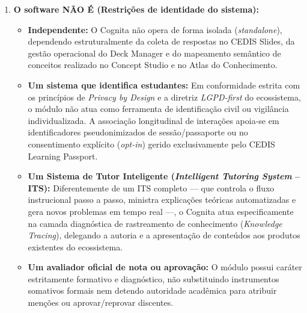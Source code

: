 \begin{enumerate}
    \item \textbf{O software NÃO É (Restrições de identidade do sistema):}
    \begin{itemize}
        \item \textbf{Independente:} O Cognita não opera de forma isolada (\textit{standalone}), dependendo estruturalmente da coleta de respostas no CEDIS Slides, da gestão operacional do Deck Manager e do mapeamento semântico de conceitos realizado no Concept Studio e no Atlas do Conhecimento.
        \item \textbf{Um sistema que identifica estudantes:} Em conformidade estrita com os princípios de \textit{Privacy by Design} \cite{cavoukian_privacy_2009} e a diretriz \textit{LGPD-first} do ecossistema, o módulo não atua como ferramenta de identificação civil ou vigilância individualizada. A associação longitudinal de interações apoia-se em identificadores pseudonimizados de sessão/passaporte ou no consentimento explícito (\textit{opt-in}) gerido exclusivamente pelo CEDIS Learning Passport.
        \item \textbf{Um Sistema de Tutor Inteligente (\textit{Intelligent Tutoring System} -- ITS):} Diferentemente de um ITS completo — que controla o fluxo instrucional passo a passo, ministra explicações teóricas automatizadas e gera novos problemas em tempo real —, o Cognita atua especificamente na camada diagnóstica de rastreamento de conhecimento (\textit{Knowledge Tracing}), delegando a autoria e a apresentação de conteúdos aos produtos existentes do ecossistema.
        \item \textbf{Um avaliador oficial de nota ou aprovação:} O módulo possui caráter estritamente formativo e diagnóstico, não substituindo instrumentos somativos formais nem detendo autoridade acadêmica para atribuir menções ou aprovar/reprovar discentes.
    \end{itemize}


\end{enumerate}
